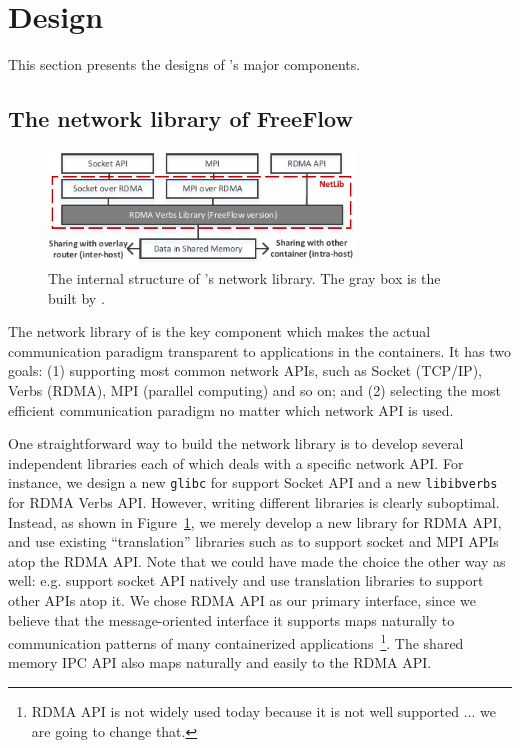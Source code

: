 \section{Design} \label{sec:design}

This section presents the designs of \sysname's major components. 

\subsection{The network library of FreeFlow}
\label{subsec:netlib}

\begin{figure}[t!] 
     \centering 
     \includegraphics[width=3.2in]{figures/netlib.pdf} 
    \caption{\label{fig:netlib} The internal structure of \sysname's network library. The gray box is the built by \sysname.} 
\end{figure} 

The network library of \sysname is the key component which makes the actual
communication paradigm transparent to applications in the containers.  It has
two goals: (1) supporting most common network APIs, such as Socket (TCP/IP),
Verbs (RDMA), MPI (parallel computing) and so on; and (2) selecting the most
efficient communication paradigm no matter which network API is used. 

One straightforward way to build the network library is to develop several
independent libraries each of which deals with a specific network API.  For
instance, we design a new \texttt{glibc} for support Socket API and a new
\texttt{libibverbs} for RDMA Verbs API. However, writing different libraries is
clearly suboptimal. Instead, as shown in  Figure~\ref{fig:netlib}, we merely
develop a new library for RDMA API, and use existing ``translation'' libraries
such as \cite{rsockets,sdp,rfc7609,mpi-rdma} to support socket and MPI APIs
atop the RDMA API. Note that we could have made the choice the other way as
well: e.g. support socket API natively and use translation libraries to support
other APIs atop it. We chose RDMA API as our primary interface, since we believe
that the message-oriented interface it supports maps naturally to communication
patterns of many containerized applications~\footnote{RDMA API is not widely
used today because it is not well supported ... we are going to change that.}.
The shared memory IPC API also maps naturally and easily to the RDMA API.

